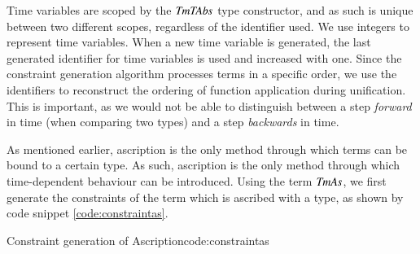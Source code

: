 Time variables are scoped by the \ensuremath{\Conid{TmTAbs}} type constructor, and as such is unique between two different scopes, regardless of the identifier used.
We use integers to represent time variables. 
When a new time variable is generated, the last generated identifier for time variables is used and increased with one.
Since the constraint generation algorithm processes terms in a specific order, we use the identifiers to reconstruct the ordering of function application during unification.
This is important, as we would not be able to distinguish between a step \textit{forward} in time (when comparing two types) and a step \textit{backwards} in time.

As mentioned earlier, ascription is the only method through which terms can be bound to a certain type.
As such, ascription is the only method through which time-dependent behaviour can be introduced.
Using the term \ensuremath{\Conid{TmAs}}, we first generate the constraints of the term which is ascribed with a type, as shown by code snippet \ref{code:constraintas}.
\begin{texexptitled}{Constraint generation of Ascription}{code:constraintas}
\begin{hscode}\SaveRestoreHook
{}%
%
%
%
\>[B]{}\;\;\to {}\<[E]%
\\
\>[B]{}\<[9]%
\>[9]{}\;{}\<[13]%
\>[13]{}\leftarrow{}\;\<[E]%
\\
\>[13]{}\leftarrow{}\;\<[E]%
\\
\>[13]{}\<[E]%
\\
\>[13]{}\;\<[E]%
\ColumnHook
\end{hscode}\resethooks
\end{texexptitled}

